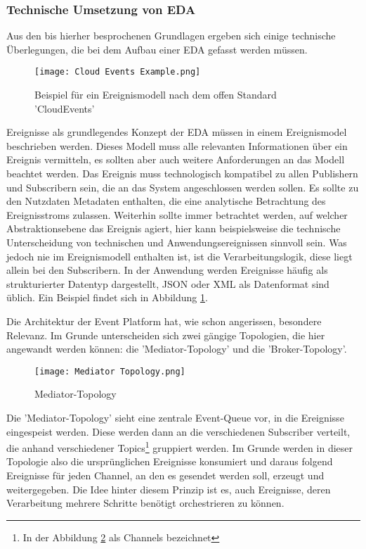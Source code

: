 \subsubsection*{Technische Umsetzung von \ac{EDA}}
\label{teda}
Aus den bis hierher besprochenen Grundlagen ergeben sich einige technische Überlegungen, die bei dem Aufbau einer \ac{EDA} gefasst werden müssen.

\begin{figure}[H]
  \centering
  \texttt{[image: Cloud Events Example.png]}
  \caption[Beispiel für ein Ereignismodell]{Beispiel für ein Ereignismodell nach dem offen Standard 'CloudEvents' \footnotemark}
  \label{cloudeventslabel}
\end{figure}
Ereignisse als grundlegendes Konzept der \ac{EDA} müssen in einem Ereignismodel beschrieben werden. Dieses Modell muss alle relevanten Informationen über ein Ereignis vermitteln, es sollten aber auch weitere Anforderungen an das Modell beachtet werden. Das Ereignis muss technologisch kompatibel zu allen Publishern und Subscribern sein, die an das System angeschlossen werden sollen. Es sollte zu den Nutzdaten Metadaten enthalten, die eine analytische Betrachtung des Ereignisstroms zulassen. Weiterhin sollte immer betrachtet werden, auf welcher Abstraktionsebene das Ereignis agiert, hier kann beispielsweise die technische Unterscheidung von technischen und Anwendungsereignissen sinnvoll sein. Was jedoch nie im Ereignismodell enthalten ist, ist die Verarbeitungslogik, diese liegt allein bei den Subscribern.\cite[Vgl. ][S. 95]{EDA2010} In der Anwendung werden Ereignisse häufig als strukturierter Datentyp dargestellt, JSON oder XML als Datenformat sind üblich. Ein Beispiel findet sich in Abbildung \ref{cloudeventslabel}.

Die Architektur der Event Platform hat, wie schon angerissen, besondere Relevanz. Im Grunde unterscheiden sich zwei gängige Topologien, die hier angewandt werden können: die 'Mediator-Topology' und die 'Broker-Topology'. 
\begin{figure}[H]
  \centering
  \texttt{[image: Mediator Topology.png]}
  \caption[Mediator-Topology]{Mediator-Topology \footnotemark}
  \label{mediatortop}
\end{figure}
Die 'Mediator-Topology' sieht eine zentrale Event-Queue vor, in die Ereignisse eingespeist werden. Diese werden dann an die verschiedenen Subscriber verteilt, die anhand verschiedener Topics\footnote{In der Abbildung \ref{mediatortop} als Channels bezeichnet} gruppiert werden. Im Grunde werden in dieser Topologie also die ursprünglichen Ereignisse konsumiert und daraus folgend Ereignisse für jeden Channel, an den es gesendet werden soll, erzeugt und weitergegeben. Die Idee hinter diesem Prinzip ist es, auch Ereignisse, deren Verarbeitung mehrere Schritte benötigt orchestrieren zu können. \cite[Vgl. ][]{wickramarachchi_2017_event} \\

